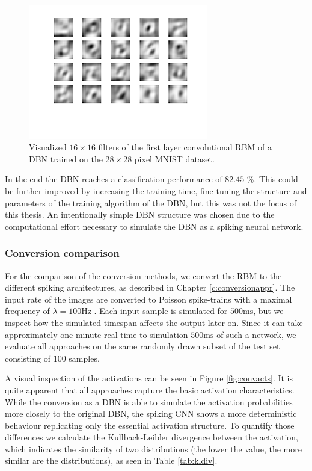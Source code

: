 \begin{figure}[h!]
	\centering
    	\includegraphics[width=0.7\textwidth]{imgs/weights_rbm.png} 
    \caption{Visualized $16 \times 16$ filters of the first layer convolutional RBM of a DBN trained on the $28 \times 28$ pixel MNIST dataset.}
	\label{fig:rbmw}
\end{figure}

In the end the DBN reaches a classification performance of $82.45$ \%. 
This could be further improved by increasing the training time, fine-tuning the structure and parameters of the training algorithm of the DBN, but this was not the focus of this thesis.
An intentionally simple DBN structure was chosen due to the computational effort necessary to simulate the DBN as a spiking neural network. 


\subsubsection{Conversion comparison} \label{c:conversioncomp}

For the comparison of the conversion methods, we convert the RBM to the different spiking architectures, as described in Chapter \ref{c:conversionappr}. 
The input rate of the images are converted to Poisson spike-trains with a maximal frequency of $\lambda = 100 \text{Hz}$ .
Each input sample is simulated for $500 \text{ms}$, but we inspect how the simulated timespan affects the output later on.
Since it can take approximately one minute real time to simulation $500 \text{ms}$ of such a network, we evaluate all approaches on the same randomly drawn subset of the test set consisting of $100$ samples.

A visual inspection of the activations can be seen in Figure \ref{fig:convacts}. 
It is quite apparent that all approaches capture the basic activation characteristics. 
While the conversion as a DBN is able to simulate the activation probabilities more closely to the original DBN, the spiking CNN shows a more deterministic behaviour replicating only the essential activation structure.
To quantify those differences we calculate the Kullback-Leibler divergence between the activation, which indicates the similarity of two distributions (the lower the value, the more similar are the distributions), as seen in Table \ref{tab:kldiv}.



